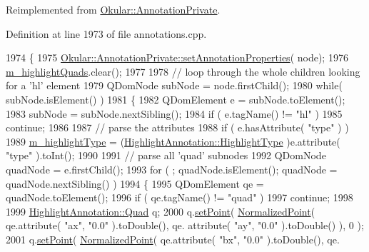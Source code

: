 Reimplemented from \hyperlink{classOkular_1_1AnnotationPrivate_a5fc7b450fa8c7e2717372e7394c3aa39}{Okular\+::\+Annotation\+Private}.



Definition at line 1973 of file annotations.\+cpp.


\begin{DoxyCode}
1974 \{
1975     \hyperlink{classOkular_1_1AnnotationPrivate_a5fc7b450fa8c7e2717372e7394c3aa39}{Okular::AnnotationPrivate::setAnnotationProperties}(
      node);
1976     \hyperlink{classOkular_1_1HighlightAnnotationPrivate_aa822b72c9bf0a2001ed17ce4bedb04f0}{m\_highlightQuads}.clear();
1977 
1978     \textcolor{comment}{// loop through the whole children looking for a 'hl' element}
1979     QDomNode subNode = node.firstChild();
1980     \textcolor{keywordflow}{while}( subNode.isElement() )
1981     \{
1982         QDomElement e = subNode.toElement();
1983         subNode = subNode.nextSibling();
1984         \textcolor{keywordflow}{if} ( e.tagName() != \textcolor{stringliteral}{"hl"} )
1985             \textcolor{keywordflow}{continue};
1986 
1987         \textcolor{comment}{// parse the attributes}
1988         \textcolor{keywordflow}{if} ( e.hasAttribute( \textcolor{stringliteral}{"type"} ) )
1989             \hyperlink{classOkular_1_1HighlightAnnotationPrivate_a9d5963335b5a637d21b5737250da329b}{m\_highlightType} = (\hyperlink{classOkular_1_1HighlightAnnotation_a63d2488735d1d6320e2e118743243999}{HighlightAnnotation::HighlightType}
      )e.attribute( \textcolor{stringliteral}{"type"} ).toInt();
1990 
1991         \textcolor{comment}{// parse all 'quad' subnodes}
1992         QDomNode quadNode = e.firstChild();
1993         \textcolor{keywordflow}{for} ( ; quadNode.isElement(); quadNode = quadNode.nextSibling() )
1994         \{
1995             QDomElement qe = quadNode.toElement();
1996             \textcolor{keywordflow}{if} ( qe.tagName() != \textcolor{stringliteral}{"quad"} )
1997                 \textcolor{keywordflow}{continue};
1998 
1999             \hyperlink{classOkular_1_1HighlightAnnotation_1_1Quad}{HighlightAnnotation::Quad} q;
2000             q.\hyperlink{classOkular_1_1HighlightAnnotation_1_1Quad_ab9ce9af2562a336d4ef3d75d468c7eed}{setPoint}( \hyperlink{classOkular_1_1NormalizedPoint}{NormalizedPoint}( qe.attribute( \textcolor{stringliteral}{"ax"}, \textcolor{stringliteral}{"0.0"} ).toDouble(), qe.
      attribute( \textcolor{stringliteral}{"ay"}, \textcolor{stringliteral}{"0.0"} ).toDouble() ), 0 );
2001             q.\hyperlink{classOkular_1_1HighlightAnnotation_1_1Quad_ab9ce9af2562a336d4ef3d75d468c7eed}{setPoint}( \hyperlink{classOkular_1_1NormalizedPoint}{NormalizedPoint}( qe.attribute( \textcolor{stringliteral}{"bx"}, \textcolor{stringliteral}{"0.0"} ).toDouble(), qe.

\end{DoxyCode}

